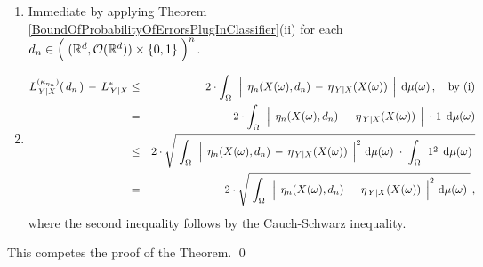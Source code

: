 \begin{enumerate}
\item
	Immediate by applying Theorem \ref{BoundOfProbabilityOfErrorsPlugInClassifier}(ii) for each
	$d_{n} \in \left(\;(\Re^{d},\mathcal{O}(\Re^{d})) \overset{{\color{white}.}}{\times} \{0,1\} \;\right)^{n}$.
\item
	\begin{eqnarray*}
	L^{(\kappa_{\eta_{n}})}_{\,Y \vert X}(\,d_{n}\,) \, - \, L^{*}_{\,Y \vert X}
	& \leq &
		2 \cdot \int_{\Omega}\,\;
			\left\vert\;\, \eta_{n}(X(\omega),d_{n}) \,\overset{{\color{white}.}}{-}\, \eta_{\,Y\vert X}(X(\omega)) \;\,\right\vert
			\;\d\mu(\omega)\,,
		\quad
		\textnormal{by (i)}
	\\
	& = &
		2 \cdot \int_{\Omega}\,\;
			\left\vert\;\, \eta_{n}(X(\omega),d_{n}) \,\overset{{\color{white}.}}{-}\, \eta_{\,Y\vert X}(X(\omega)) \;\,\right\vert
			\,\cdot\, 1
			\,\;\d\mu(\omega)
	\\
	& \leq &
		2 \cdot \sqrt{\;
			\int_{\Omega}\,\;
			\left\vert\;\, \eta_{n}(X(\omega),d_{n}) \,\overset{{\color{white}.}}{-}\, \eta_{\,Y\vert X}(X(\omega)) \;\,\right\vert^{2}
			\,\d\mu(\omega)
			\;\cdot\;
			\int_{\Omega}\,\; 1^{2} \,\;\d\mu(\omega)
			\;}
	\\
	& = &
		2 \cdot \sqrt{\;
			\int_{\Omega}\,\;
			\left\vert\;\, \eta_{n}(X(\omega),d_{n}) \,\overset{{\color{white}.}}{-}\, \eta_{\,Y\vert X}(X(\omega)) \;\,\right\vert^{2}
			\,\d\mu(\omega)
			\;}\,,
	\end{eqnarray*}
	where the second inequality follows by the Cauch-Schwarz inequality.
\end{enumerate}
This competes the proof of the Theorem.
\qed


\renewcommand{\theenumi}{\roman{enumi}}
\renewcommand{\labelenumi}{\textnormal{(\theenumi)}$\;\;$}

